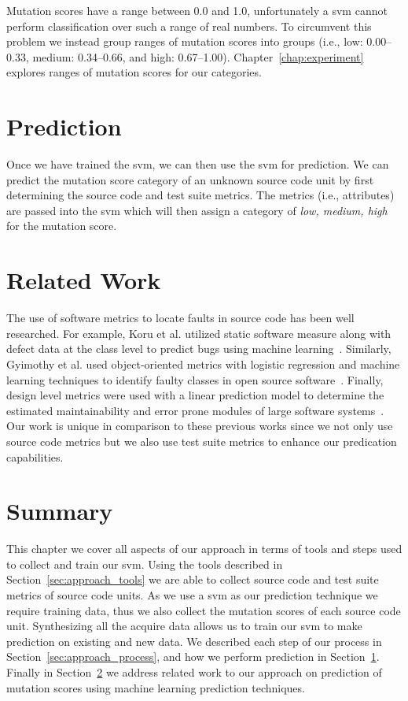 Mutation scores have a range between 0.0 and 1.0, unfortunately a \gls{svm} cannot perform classification over such a range of real numbers. To circumvent this problem we instead group ranges of mutation scores into groups (i.e., low: 0.00--0.33, medium: 0.34--0.66, and high: 0.67--1.00). Chapter~\ref{chap:experiment} explores ranges of mutation scores for our categories.


\section{Prediction}
\label{sec:approach_prediction}
Once we have trained the \gls{svm}, we can then use the \gls{svm} for prediction. We can predict the mutation score category of an unknown source code unit by first determining the source code and test suite metrics. The metrics (i.e., attributes) are passed into the \gls{svm} which will then assign a category of \textit{low, medium, high} for the mutation score.


\section{Related Work}
\label{sec:approach_related_work}
The use of software metrics to locate faults in source code has been well researched. For example, Koru et al. utilized static software measure along with defect data at the class level to predict bugs using machine learning~\cite{KL05}. Similarly, Gyimothy et al. used object-oriented metrics with logistic regression and machine learning techniques to identify faulty classes in open source software~\cite{GFS05}. Finally, design level metrics were used with a linear prediction model to determine the estimated maintainability and error prone modules of large software systems~\cite{MKPS00}. Our work is unique in comparison to these previous works since we not only use source code metrics but we also use test suite metrics to enhance our predication capabilities.


\section{Summary}
\label{sec:approach_summary}
This chapter we cover all aspects of our approach in terms of tools and steps used to collect and train our \gls{svm}. Using the tools described in Section~\ref{sec:approach_tools} we are able to collect source code and test suite metrics of source code units. As we use a \gls{svm} as our prediction technique we require training data, thus we also collect the mutation scores of each source code unit. Synthesizing all the acquire data allows us to train our \gls{svm} to make prediction on existing and new data. We described each step of our process in Section~\ref{sec:approach_process}, and how we perform prediction in Section~\ref{sec:approach_prediction}. Finally in Section~\ref{sec:approach_related_work} we address related work to our approach on prediction of mutation scores using machine learning prediction techniques.
